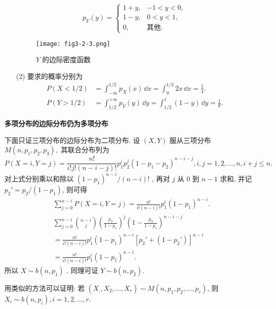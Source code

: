 \begin{solution}
\begin{itemize}
\begin{equation*}
  		p_{Y}(y)=
  		\begin{cases}
  		1+y, & -1<y<0,\\
  		1-y, & 0<y<1,\\
  		0, & \text{其他}.
  		\end{cases}
  		\end{equation*}
  		\begin{figure}[h]
  			\centering
  			\texttt{[image: fig3-2-3.png]}
  			\caption{ $Y$ 的边际密度函数}\label{fig:3.2.3}
  		\end{figure}
  		\item[(2)] 要求的概率分别为
  		\begin{align*}
  		P(X<1/2) &= \int_{-\infty}^{1/2}p_{X}(x)\,\dd x=\int_{0}^{1/2}2x\,\dd x=\frac{1}{4}.\\
  		P(Y>1/2) &= \int_{1/2}^{+\infty}p_{Y}(y)\,\dd y=\int_{1/2}^{1}(1-y)\,\dd y=\frac{1}{8}.
  		\end{align*}
  	\end{itemize}
  \end{solution}
  
  \begin{example}\label{exam:3.2.4}
  	\textbf{多项分布的边际分布仍为多项分布}
  \end{example}
  \begin{solution}
  	下面只证三项分布的边际分布为二项分布. 设 $(X,Y)$ 服从三项分布 $M(n,p_1,p_2,p_3),$  其联合分布列为
  	\begin{equation*}
  	P(X=i,Y=j)=\frac{n!}{i!j!(n-i-j)!}p_1^ip_2^j(1-p_1-p_2)^{n-i-j}, i,j=1,2,\ldots,n,i+j\leqslant n.
  	\end{equation*}
  	对上式分别乘以和除以 $(1-p_1)^{n-i}/(n-i)!$ , 再对 $j$ 从 $0$ 到 $n-1$ 求和, 并记 $p_2'=p_2/(1-p_1)$, 则可得
  	\begin{align*}
  	&\sum_{j=0}^{n-i}P(X=i,Y=j) = \frac{n!}{i!(n-i)!}p_1^i(1-p_1)^{n-i}.\\
  	&\sum_{j=0}^{n-i} \binom{n-i}{j} \left(\frac{p_2}{1-p_1}\right)^{j}\left(1-\frac{p_2}{1-p_1}\right)^{n-i-j} \\
  	&= \frac{n!}{i!(n-i)!}p_1^i(1-p_1)^{n-i}\left[p_2'+(1-p_2')\right]^{n-i}\\
  	&= \frac{n!}{i!(n-i)!}p_1^i(1-p_1)^{n-i}.
  	\end{align*}
  	所以 $X\sim b(n,p_1)$ . 同理可证 $Y\sim b(n,p_2)$.
  	
  	用类似的方法可以证明: 若 $(X_,,X_2,\ldots,X_r)\sim M(n,p_1,p_2,\ldots,p_r)$, 则 $X_i\sim b(n,p_i), i=1,2,\ldots,r$.
  \end{solution}
  
